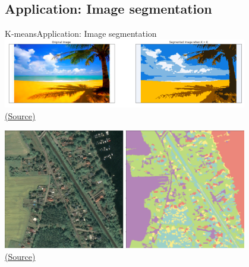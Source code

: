 \documentclass[10pt,compress]{beamer} %
\begin{document}
\subsection{Application: Image segmentation}
\begin{frame}[plain]{K-means}{Application: Image segmentation}
	\includegraphics[width=0.8\textwidth]{figs/segmentation1.png}\\
        \centering \tiny{\href{https://www.kdnuggets.com/2019/08/introduction-image-segmentation-k-means-clustering.html}{(Source)}}

    \medskip

	\includegraphics[width=0.8\textwidth]{figs/segmentation2.png}\\
        \centering \tiny{\href{https://up42.com/blog/tech/satellite-image-processing-made-simple}{(Source)}}
\end{frame}
\end{document}
